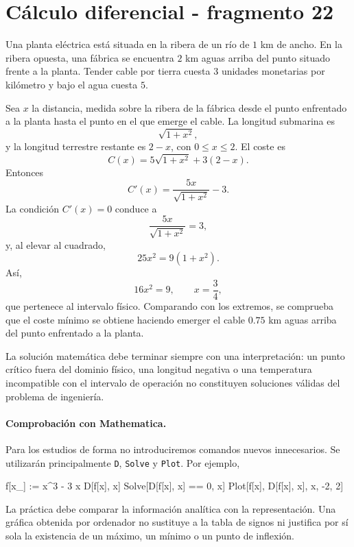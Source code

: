 \section{Cálculo diferencial - fragmento 22}
\begin{example}
Una planta eléctrica está situada en la ribera de un río de $1$ km de ancho. En la ribera opuesta, una fábrica se encuentra $2$ km aguas arriba del punto situado frente a la planta. Tender cable por tierra cuesta $3$ unidades monetarias por kilómetro y bajo el agua cuesta $5$.

Sea $x$ la distancia, medida sobre la ribera de la fábrica desde el punto enfrentado a la planta hasta el punto en el que emerge el cable. La longitud submarina es
\[
\sqrt{1+x^2},
\]
y la longitud terrestre restante es $2-x$, con $0\leq x\leq2$. El coste es
\[
C(x)=5\sqrt{1+x^2}+3(2-x).
\]
Entonces
\[
C'(x)=\frac{5x}{\sqrt{1+x^2}}-3.
\]
La condición $C'(x)=0$ conduce a
\[
\frac{5x}{\sqrt{1+x^2}}=3,
\]
y, al elevar al cuadrado,
\[
25x^2=9(1+x^2).
\]
Así,
\[
16x^2=9,
\qquad
x=\frac34,
\]
que pertenece al intervalo físico. Comparando con los extremos, se comprueba que el coste mínimo se obtiene haciendo emerger el cable $0.75$ km aguas arriba del punto enfrentado a la planta.
\end{example}

La solución matemática debe terminar siempre con una interpretación: un punto crítico fuera del dominio físico, una longitud negativa o una temperatura incompatible con el intervalo de operación no constituyen soluciones válidas del problema de ingeniería.

\paragraph{Comprobación con Mathematica.}
Para los estudios de forma no introduciremos comandos nuevos innecesarios. Se utilizarán principalmente \texttt{D}, \texttt{Solve} y \texttt{Plot}. Por ejemplo,
\begin{mathematicacode}
f[x_] := x^3 - 3 x
D[f[x], x]
Solve[D[f[x], x] == 0, x]
Plot[{f[x], D[f[x], x]}, {x, -2, 2}]
\end{mathematicacode}
La práctica debe comparar la información analítica con la representación. Una gráfica obtenida por ordenador no sustituye a la tabla de signos ni justifica por sí sola la existencia de un máximo, un mínimo o un punto de inflexión.
